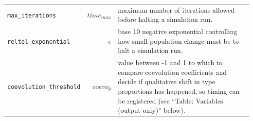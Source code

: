 \documentclass[
]{book}
\begin{document}
\begin{longtable}[]{@{}lrl@{}}
\begin{minipage}[t]{0.27\columnwidth}\raggedright
\texttt{max\_iterations}\strut
\end{minipage} & \begin{minipage}[t]{0.25\columnwidth}\raggedleft
\(time_{max}\)\strut
\end{minipage} & \begin{minipage}[t]{0.39\columnwidth}\raggedright
maximum number of iterations allowed before halting a simulation run.\strut
\end{minipage}\tabularnewline
\begin{minipage}[t]{0.27\columnwidth}\raggedright
\texttt{reltol\_exponential}\strut
\end{minipage} & \begin{minipage}[t]{0.25\columnwidth}\raggedleft
\(\epsilon\)\strut
\end{minipage} & \begin{minipage}[t]{0.39\columnwidth}\raggedright
base 10 negative exponential controlling how small population change must be to halt a simulation run.\strut
\end{minipage}\tabularnewline
\begin{minipage}[t]{0.27\columnwidth}\raggedright
\texttt{coevolution\_threshold}\strut
\end{minipage} & \begin{minipage}[t]{0.25\columnwidth}\raggedleft
\(coevo_{\theta}\)\strut
\end{minipage} & \begin{minipage}[t]{0.39\columnwidth}\raggedright
value between -1 and 1 to which to compare coevolution coefficients and decide if qualitative shift in type proportions has happened, so timing can be registered (see ``Table: Variables (output only)'' below).\strut
\end{minipage}\tabularnewline
\bottomrule
\end{longtable}
\end{document}
